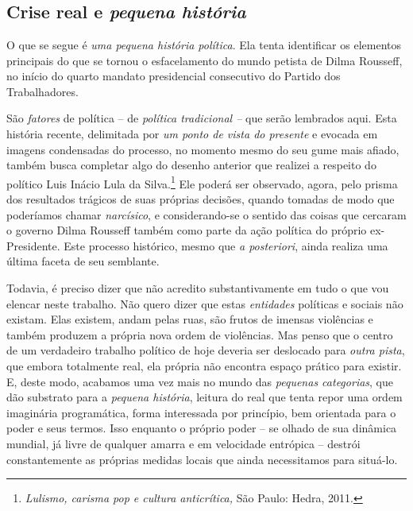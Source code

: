 

\chapter*{}

\section{Crise real e \emph{pequena
  história}}\label{crise-real-e-pequena-histuxf3ria}


O que se segue é \emph{uma pequena história política}. Ela tenta
identificar os elementos principais do que se tornou o esfacelamento do
mundo petista de Dilma Rousseff, no início do quarto mandato
presidencial consecutivo do Partido dos Trabalhadores.

São \emph{fatores} de política -- de \emph{política tradicional --} que
serão lembrados aqui. Esta história recente, delimitada por \emph{um
ponto de vista do presente} e evocada em imagens condensadas do
processo, no momento mesmo do seu gume mais afiado, também busca
completar algo do desenho anterior que realizei a respeito do político
Luis Inácio Lula da Silva.\footnote{\emph{Lulismo, carisma pop e cultura
anticrítica,} São Paulo: Hedra, 2011.} Ele
poderá ser observado, agora, pelo prisma dos resultados trágicos de suas
próprias decisões, quando tomadas de modo que poderíamos chamar
\emph{narcísico}, e considerando-se o sentido das coisas que cercaram o
governo Dilma Rousseff também como parte da ação política do próprio
ex-Presidente. Este processo histórico, mesmo que \textit{a posteriori}, ainda
realiza uma última faceta de seu semblante.

Todavia, é preciso dizer que não acredito substantivamente em tudo o que
vou elencar neste trabalho. Não quero dizer que estas \emph{entidades}
políticas e sociais não existam. Elas existem, andam pelas ruas, são
frutos de imensas violências e também produzem a própria nova ordem de
violências. Mas penso que o centro de um verdadeiro trabalho político
de hoje deveria ser deslocado para \emph{outra pista}, que embora
totalmente real, ela própria não encontra espaço prático para existir.
E, deste modo, acabamos uma vez mais no mundo das \emph{pequenas
categorias}, que dão substrato para a \emph{pequena história}, leitura
do real que tenta repor uma ordem imaginária programática, forma
interessada por princípio, bem orientada para o poder e seus termos.
Isso enquanto o próprio poder – se olhado de sua dinâmica mundial, já livre de
qualquer amarra e em velocidade entrópica – destrói constantemente as próprias
medidas locais que ainda necessitamos para situá-lo.

